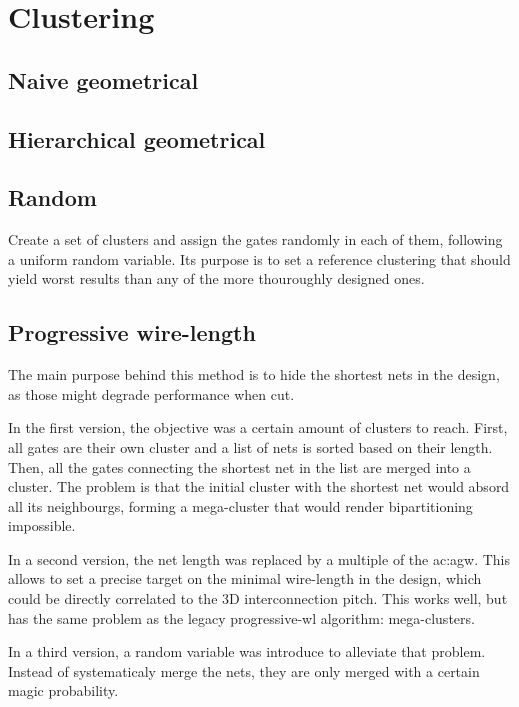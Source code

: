 \section{Clustering}

\subsection{Naive geometrical}

\subsection{Hierarchical geometrical}

\subsection{Random}
Create a set of clusters and assign the gates randomly in each of them, following a uniform random variable.
Its purpose is to set a reference clustering that should yield worst results than any of the more thouroughly designed ones.

\subsection{Progressive wire-length}
The main purpose behind this method is to hide the shortest nets in the design, as those might degrade performance when cut.

In the first version, the objective was a certain amount of clusters to reach.
First, all gates are their own cluster and a list of nets is sorted based on their length.
Then, all the gates connecting the shortest net in the list are merged into a cluster.
The problem is that the initial cluster with the shortest net would absord all its neighbourgs, forming a mega-cluster that would render bipartitioning impossible.

In a second version, the net length was replaced by a multiple of the \gls{ac:agw}.
This allows to set a precise target on the minimal wire-length in the design, which could be directly correlated to the 3D interconnection pitch.
This works well, but has the same problem as the legacy progressive-wl algorithm: mega-clusters.

In a third version, a random variable was introduce to alleviate that problem.
Instead of systematicaly merge the nets, they are only merged with a certain magic probability.




